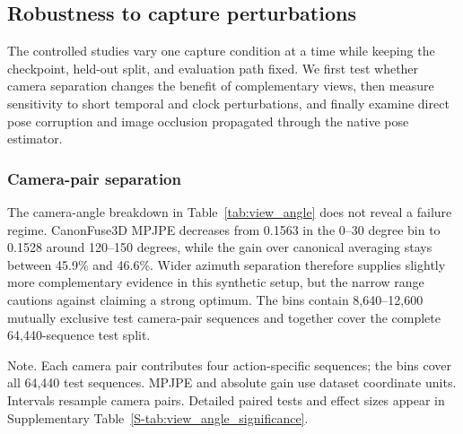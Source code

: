 \documentclass[preprint,12pt]{elsarticle}
\renewcommand{\textit}[1]{\textup{#1}}
\begin{document}
\FloatBarrier
\subsection{Robustness to capture perturbations}


The controlled studies vary one capture condition at a time while keeping the checkpoint, held-out split, and evaluation path fixed. We first test whether camera separation changes the benefit of complementary views, then measure sensitivity to short temporal and clock perturbations, and finally examine direct pose corruption and image occlusion propagated through the native pose estimator.

\subsubsection{Camera-pair separation}

The camera-angle breakdown in Table~\ref{tab:view_angle} does not reveal a failure regime. CanonFuse3D MPJPE decreases from 0.1563 in the 0--30 degree bin to 0.1528 around 120--150 degrees, while the gain over canonical averaging stays between 45.9\% and 46.6\%. Wider azimuth separation therefore supplies slightly more complementary evidence in this synthetic setup, but the narrow range cautions against claiming a strong optimum. The bins contain 8,640--12,600 mutually exclusive test camera-pair sequences and together cover the complete 64,440-sequence test split.

\begin{table}[t]
\centering
\caption{Accuracy and camera-pair bootstrap intervals by azimuth separation. Positive gain favors CanonFuse3D.}
\label{tab:view_angle}
\small
\setlength{\tabcolsep}{4pt}
\vspace{0.3em}
\begin{minipage}{0.97\linewidth}
\footnotesize\textit{Note.} Each camera pair contributes four action-specific sequences; the bins cover all 64,440 test sequences. MPJPE and absolute gain use dataset coordinate units. Intervals resample camera pairs. Detailed paired tests and effect sizes appear in Supplementary Table~\ref{S-tab:view_angle_significance}.
\end{minipage}
\end{table}
\end{document}
